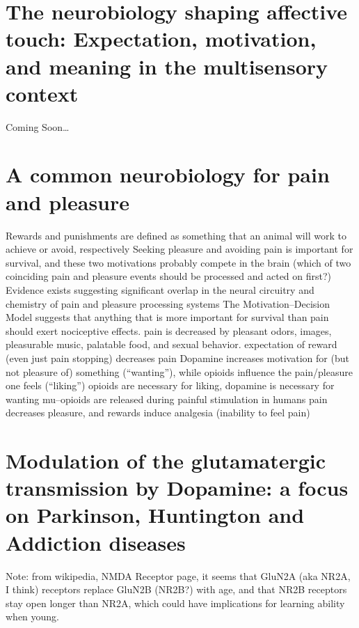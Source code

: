 \documentclass[11pt, a4paper, oneside]{article}   	%
\begin{document}
\section{The neurobiology shaping affective touch: Expectation, motivation, and meaning in the multisensory context \cite{Ellingsen2016}}

Coming Soon\ldots

\section{A common neurobiology for pain and pleasure \cite{Leknes2008}}

\begin{outline}
    \point Rewards and punishments are defined as something that an animal will work to achieve or avoid, respectively
        \subpoint Seeking pleasure and avoiding pain is important for survival, and these two motivations probably compete in the brain (which of two coinciding pain and pleasure events should be processed and acted on first?)
        \subpoint Evidence exists suggesting significant overlap in the neural circuitry and chemistry of pain and pleasure processing systems
    \point The Motivation--Decision Model suggests that anything that is more important for survival than pain should exert nociceptive effects.
    \point pain is decreased by pleasant odors, images, pleasurable music, palatable food, and sexual behavior.
    \point expectation of reward (even just pain stopping) decreases pain
    \point Dopamine increases motivation for (but not pleasure of) something (``wanting''), while opioids influence the pain/pleasure one feels (``liking'')
        \subpoint opioids are necessary for liking, dopamine is necessary for wanting
    \point mu--opioids are released during painful stimulation in humans
    \point pain decreases pleasure, and rewards induce analgesia (inability to feel pain)
    
\end{outline}

\section{Modulation of the glutamatergic transmission by Dopamine: a focus on Parkinson, Huntington and Addiction diseases \cite{Gardoni2015}}

Note: from wikipedia, NMDA Receptor page, it seems that GluN2A (aka NR2A, I think) receptors replace GluN2B (NR2B?) with age, and that  NR2B receptors stay open longer than NR2A, which could have implications for learning ability when young.
\end{document}

